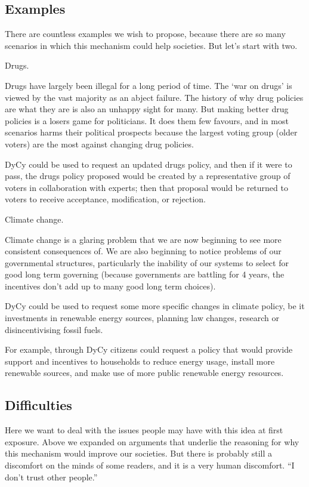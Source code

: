 \documentclass[twoside]{article}
\theoremstyle{definition}
\begin{document}
\subsection{Examples}

There are countless examples we wish to propose, because there are so many scenarios in which this mechanism could help societies. But let’s start with two.

Drugs.

Drugs have largely been illegal for a long period of time. The ‘war on drugs’ is viewed by the vast majority as an abject failure. The history of why drug policies are what they are is also an unhappy sight for many. But making better drug policies is a losers game for politicians. It does them few favours, and in most scenarios harms their political prospects because the largest voting group (older voters) are the most against changing drug policies.

DyCy could be used to request an updated drugs policy, and then if it were to pass, the drugs policy proposed would be created by a representative group of voters in collaboration with experts; then that proposal would be returned to voters to receive acceptance, modification, or rejection. 

Climate change.

Climate change is a glaring problem that we are now beginning to see more consistent consequences of. We are also beginning to notice problems of our governmental structures, particularly the inability of our systems to select for good long term governing (because governments are battling for 4 years, the incentives don’t add up to many good long term choices).

DyCy could be used to request some more specific changes in climate policy, be it investments in renewable energy sources, planning law changes, research or disincentivising fossil fuels.

For example, through DyCy citizens could request a policy that would provide support and incentives to households to reduce energy usage, install more renewable sources, and make use of more public renewable energy resources.

\subsection{Difficulties}

Here we want to deal with the issues people may have with this idea at first exposure. Above we expanded on arguments that underlie the reasoning for why this mechanism would improve our societies. But there is probably still a discomfort on the minds of some readers, and it is a very human discomfort. “I don’t trust other people.”
\end{document}
